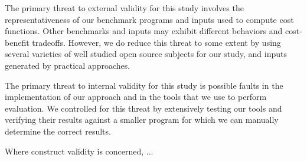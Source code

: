The primary threat to external validity 
for this study involves the representativeness 
of our benchmark programs and inputs used
to compute cost functions.
Other benchmarks and inputs may exhibit different 
behaviors and cost-benefit tradeoffs.
However, we do reduce this threat to some extent by
using several varieties of well studied open source subjects 
for our study, and inputs generated by practical approaches.

The primary threat to internal validity for this study
is possible faults in the implementation of our approach
and in the tools that we use to perform evaluation.
We controlled for this threat by extensively testing
our tools and verifying their results against a smaller
program for which we can manually determine the correct results.

Where construct validity is concerned, ...

